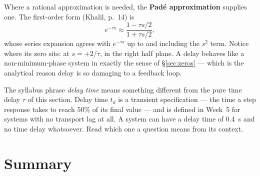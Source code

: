 \documentclass[11pt,a4paper]{article}
\begin{document}
Where a rational approximation is needed, the \textbf{Pad\'e approximation}
supplies one. The first-order form (Khalil, p.~14) is
\begin{equation}
  e^{-\tau s} \approx \frac{1-\tau s/2}{1+\tau s/2} ,
  \label{eq:pade}
\end{equation}
whose series expansion agrees with $e^{-\tau s}$ up to and including the $s^{2}$
term. Notice where its zero sits: at $s=+2/\tau$, in the right half plane. A
delay behaves like a non-minimum-phase system in exactly the sense of
\S\ref{sec:zeros} --- which is the analytical reason delay is so damaging to a
feedback loop.

\begin{pitfall}
The syllabus phrase \emph{delay time} means something different from the pure
time delay $\tau$ of this section. Delay time $t_d$ is a transient
specification --- the time a step response takes to reach $50\%$ of its final
value --- and is defined in Week~5 for systems with no transport lag at all. A
system can have a delay time of \SI{0.4}{\second} and no time delay whatsoever.
Read which one a question means from its context.
\end{pitfall}

\section*{Summary}
\end{document}
